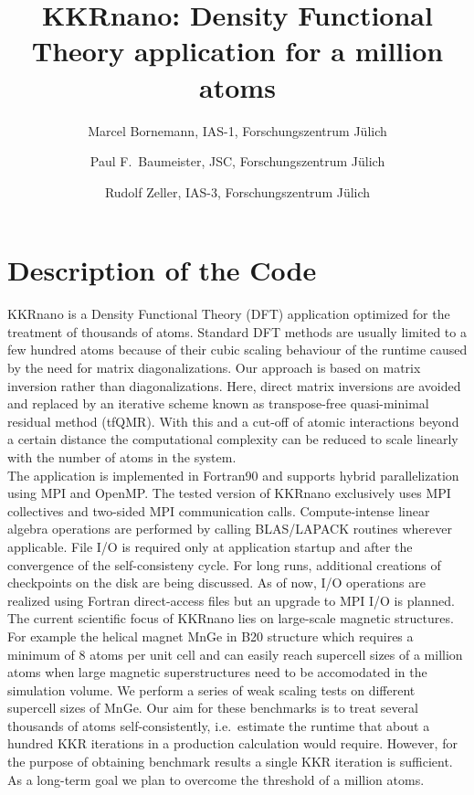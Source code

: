\title{KKRnano: Density Functional Theory application for a million atoms}
\author{
        Marcel Bornemann, IAS-1, Forschungszentrum J{\"u}lich
        \and
        Paul F.~Baumeister, JSC, Forschungszentrum J{\"u}lich
         \and
        Rudolf Zeller, IAS-3, Forschungszentrum J{\"u}lich
        }
\date{}

\maketitle

\section*{Description of the Code} 

KKRnano is a Density Functional Theory (DFT) application optimized 
for the treatment of thousands of atoms.
Standard DFT methods are usually limited to a few hundred atoms because of
their cubic scaling behaviour of the runtime caused by the need for matrix diagonalizations.
Our approach is based on matrix inversion rather than diagonalizations. 
Here, direct matrix inversions are avoided and replaced by
an iterative scheme known as transpose-free quasi-minimal residual method (tfQMR).
With this and a cut-off of atomic interactions beyond a certain distance
the computational complexity can be reduced to scale linearly 
with the number of atoms in the system.\cite{zeller_towards_2008,kkrnano:thiess_massively_2012}
\\
The application is implemented in Fortran90 and supports hybrid parallelization 
using MPI and OpenMP.
The tested version of KKRnano exclusively uses MPI collectives and two-sided MPI communication calls.
Compute-intense linear algebra operations are performed by calling BLAS/LAPACK routines wherever applicable.
File I/O is required only at application startup and after the convergence of the self-consisteny cycle.
For long runs, additional creations of checkpoints on the disk are being discussed. 
As of now, I/O operations are realized using Fortran direct-access files but an upgrade to MPI I/O is planned.
\\
The current scientific focus of KKRnano lies on large-scale magnetic structures.
For example the helical magnet MnGe in B20 structure which requires a minimum of 8 atoms per unit cell 
and can easily reach supercell sizes of a million atoms when large magnetic superstructures need to be accomodated in the simulation volume.
We perform a series of weak scaling tests on different supercell sizes of MnGe.
Our aim for these benchmarks is to treat several thousands of atoms self-consistently, 
i.e.~estimate the runtime that about a hundred KKR iterations in a production calculation would require.
However, for the purpose of obtaining benchmark results a single KKR iteration is sufficient.
\\
As a long-term goal we plan to overcome the threshold of a million atoms.


